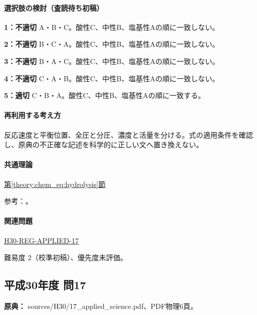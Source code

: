 \paragraph{選択肢の検討（査読待ち初稿）}\mbox{}\par

\noindent\textbf{1：不適切} A・B・C。酸性C、中性B、塩基性Aの順に一致しない。\par

\noindent\textbf{2：不適切} B・C・A。酸性C、中性B、塩基性Aの順に一致しない。\par

\noindent\textbf{3：不適切} B・A・C。酸性C、中性B、塩基性Aの順に一致しない。\par

\noindent\textbf{4：不適切} C・A・B。酸性C、中性B、塩基性Aの順に一致しない。\par

\noindent\textbf{5：適切} C・B・A。酸性C、中性B、塩基性Aの順に一致する。\par

\paragraph{再利用する考え方} 反応速度と平衡位置、全圧と分圧、濃度と活量を分ける。式の適用条件を確認し、原典の不正確な記述を科学的に正しい文へ置き換えない。

\paragraph{共通理論} \hyperref[theory:chem_eq:hydrolysis]{第\ref*{theory:chem_eq:hydrolysis}節}

\par 参考：\cite{iupac_greenbook2012,mit_buffer2008}。

\paragraph{関連問題} \hyperref[q:h30-reg-applied-17]{H30-REG-APPLIED-17}

\par 難易度 2（校準初稿）、優先度未評価。

\subsection{平成30年度 問17}
\label{q:h30-reg-applied-17}

\noindent\textbf{原典：} sources/H30/17\_applied\_science.pdf、PDF物理6頁。

